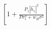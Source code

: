 \documentclass[preview]{standalone}
\begin{document}
\begin{align*}
\left[1 + \frac{P_1 \left|\hat{h_1}\right|^2}{P \sigma_{\epsilon}^2 + w_B \sigma^2}\right]
\end{align*}
\end{document}
